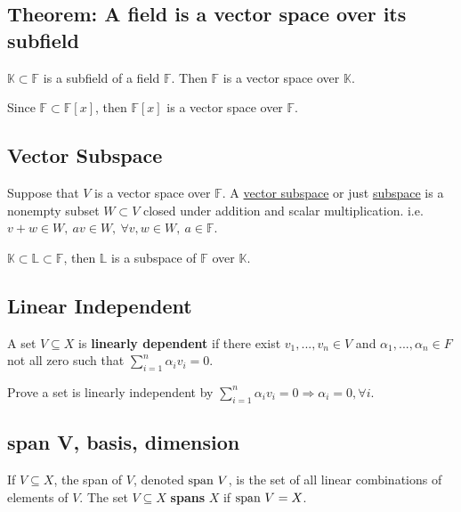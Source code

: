 \documentclass[11pt]{elegantbook}
\begin{document}
\subsection{Theorem: A field is a vector space over its subfield}
\begin{theorem}
    $\mathbb{K}\subset\mathbb{F}$ is a subfield of a field $\mathbb{F}$. Then $\mathbb{F}$ is a vector space over $\mathbb{K}$.
\end{theorem}
\begin{example}
    Since $\mathbb{F}\subset \mathbb{F}[x]$, then $\mathbb{F}[x]$ is a vector space over $\mathbb{F}$.
\end{example}
\subsection{Vector Subspace}
Suppose that $V$ is a vector space over $\mathbb{F}$. A \underline{vector subspace} or just \underline{subspace} is a nonempty subset $W\subset V$ closed under addition and scalar multiplication. i.e. $v+w\in W,\ av\in W,\ \forall v,w\in W,\ a\in \mathbb{F}$.
\begin{example}
$\mathbb{K}\subset \mathbb{L}\subset \mathbb{F}$, then $\mathbb{L}$ is a subspace of $\mathbb{F}$ over $\mathbb{K}$.
\end{example}
\subsection{Linear Independent}
\begin{definition}
    \normalfont
    A set $V \subseteq X$ is \textbf{linearly dependent} if there exist $v_1,...,v_n \in V$ and $\alpha_1,...,\alpha_n \in F$ not all zero such that $\sum_{i=1}^n\alpha_iv_i=0$.
\end{definition}
Prove a set is linearly independent by $\sum_{i=1}^n\alpha_iv_i=0 \Rightarrow \alpha_i=0,\forall i$.

\subsection{span V, basis, dimension}
\begin{definition}[Span]
    \normalfont
    If $V \subseteq X$, the span of $V$, denoted $\textnormal{span }V$, is the set of all linear combinations of elements of $V$.
    The set $V \subseteq X$ \textbf{spans} $X$ if $\textnormal{span }V=X$.
\end{definition}
\end{document}
